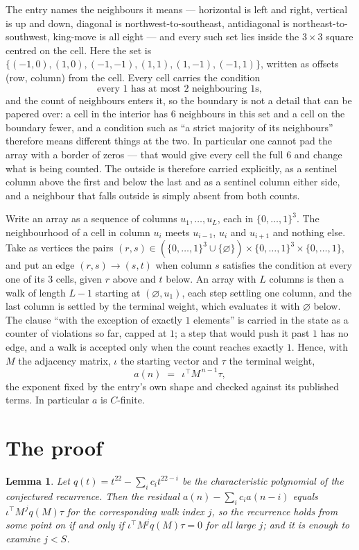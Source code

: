 \documentclass[11pt,a4paper]{article}
\theoremstyle{plain}
\newtheorem{lemma}[theorem]{Lemma}
\theoremstyle{definition}
\begin{document}
The entry names the neighbours it means --- horizontal is left and right, vertical is up and
down, diagonal is northwest-to-southeast, antidiagonal is northeast-to-southwest, king-move is
all eight --- and every such set lies inside the $3\times3$ square centred on the cell. Here
the set is $\{(-1,0), (1,0), (-1,-1), (1,1), (1,-1), (-1,1)\}$, written as offsets (row, column) from the cell. Every cell carries
the condition
\[
\text{every 1 has at most 2 neighbouring 1s},
\]
and the count of neighbours enters it, so the boundary is not a detail that can be papered
over: a cell in the interior has $6$ neighbours in this set and a cell on the boundary
fewer, and a condition such as ``a strict majority of its neighbours'' therefore means
different things at the two. In particular one cannot pad the array with a border of zeros ---
that would give every cell the full $6$ and change what is being counted. The outside is
therefore carried
explicitly, as a sentinel column above the first and below the last and as a sentinel column
either side, and a neighbour that falls outside is simply absent from both counts.

Write an array as a sequence of columns $u_1,\dots,u_L$, each in
$\{0,\dots,1\}^{3}$. The neighbourhood of a cell in column $u_i$ meets $u_{i-1}$,
$u_i$ and $u_{i+1}$ and nothing else. Take as vertices the pairs
$(r,s)\in(\{0,\dots,1\}^{3}\cup\{\varnothing\})\times\{0,\dots,1\}^{3} \times \{0,\dots,1\}$,
and put an edge $(r,s)\to(s,t)$ when column $s$ satisfies the condition at every one of its
$3$ cells, given $r$ above and $t$ below. An array with $L$ columns is then a walk of length
$L-1$ starting at $(\varnothing,u_1)$, each step settling one column, and the last column is
settled by the terminal weight, which evaluates it with $\varnothing$ below. The clause ``with the exception of exactly $1$ elements'' is carried in
the state as a counter of violations so far, capped at $1$; a step that would push it past
$1$ has no edge, and a walk is accepted only when the count reaches exactly $1$. Hence,
with $M$ the adjacency matrix, $\iota$ the starting vector and $\tau$ the terminal weight,
\[
a(n)\;=\;\,\iota^{\!\top}M^{\,n-1}\tau ,
\]
the exponent fixed by the entry's own shape and checked against its published terms. In
particular $a$ is $C$-finite.

\section{The proof}

\begin{lemma}\label{lem:crit}
Let $q(t)=t^{22}-\sum_i c_it^{22-i}$ be the characteristic polynomial of the
conjectured recurrence. Then the residual $a(n)-\sum_ic_ia(n-i)$ equals
$\iota^{\!\top}M^{\,j}q(M)\tau$ for the corresponding walk index $j$, so the
recurrence holds from some point on if and only if $\iota^{\!\top}M^{j}q(M)\tau=0$ for all
large $j$; and it is enough to examine $j<S$.
\end{lemma}
\end{document}
